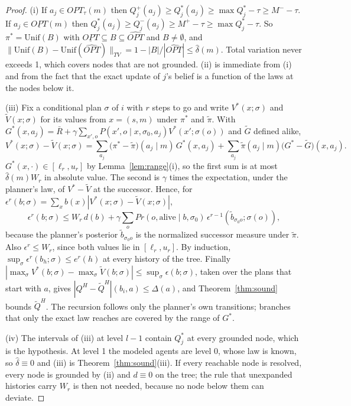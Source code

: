 \documentclass{article}
\newcommand{\OPT}{\mathit{OPT}}
\renewcommand{\Pr}{\mathit{Pr}}
\begin{document}
\begin{proof}
(i) If $a_j\in\OPT_\tau(m)$ then $Q_j^+(a_j)\ge Q_j^\ast(a_j)\ge\max Q_j^\ast-\tau\ge M^--\tau$. If
$a_j\in\underline{\OPT}(m)$ then $Q_j^\ast(a_j)\ge Q_j^-(a_j)\ge M^+-\tau\ge\max Q_j^\ast-\tau$. So
$\pi^\ast=\mathrm{Unif}(B)$ with $\underline{\OPT}\subseteq B\subseteq\widehat{\OPT}$ and $B\neq\emptyset$, and
$\|\mathrm{Unif}(B)-\mathrm{Unif}(\widehat{\OPT})\|_{TV}=1-|B|/|\widehat{\OPT}|\le\hat\delta(m)$. Total
variation never exceeds 1, which covers nodes that are not grounded. (ii) is immediate from (i) and from the
fact that the exact update of $j$'s belief is a function of the laws at the nodes below it.

(iii) Fix a conditional plan $\sigma$ of $i$ with $r$ steps to go and write $V^\ast(x;\sigma)$ and
$\tilde V(x;\sigma)$ for its values from $x=(s,m)$ under $\pi^\ast$ and $\tilde\pi$. With
$G^\ast(x,a_j)=\bar R+\gamma\sum_{x',o}P(x',o\mid x,\sigma_0,a_j)V^\ast(x';\sigma(o))$ and $\tilde G$ defined
alike,
\[
V^\ast(x;\sigma)-\tilde V(x;\sigma)=\sum_{a_j}\big(\pi^\ast-\tilde\pi\big)(a_j\mid m)\,G^\ast(x,a_j)
+\sum_{a_j}\tilde\pi(a_j\mid m)\big(G^\ast-\tilde G\big)(x,a_j).
\]
$G^\ast(x,\cdot)\in[\ell_r,u_r]$ by Lemma~\ref{lem:range}(i), so the first sum is at most
$\hat\delta(m)W_r$ in absolute value. The second is $\gamma$ times the expectation, under the planner's law, of
$V^\ast-\tilde V$ at the successor. Hence, for $\epsilon^r(b;\sigma)=\sum_xb(x)|V^\ast(x;\sigma)-\tilde
V(x;\sigma)|$,
\[
\epsilon^r(b;\sigma)\le W_r\,d(b)+\gamma\sum_o\Pr(o,\mathrm{alive}\mid b,\sigma_0)\,
\epsilon^{r-1}(\tilde b_{\sigma_0o};\sigma(o)),
\]
because the planner's posterior $\tilde b_{\sigma_0o}$ is the normalized successor measure under
$\tilde\pi$. Also $\epsilon^r\le W_r$, since both values lie in $[\ell_r,u_r]$. By induction,
$\sup_\sigma\epsilon^r(b_h;\sigma)\le e^r(h)$ at every history of the tree. Finally
$|\max_\sigma V^\ast(b;\sigma)-\max_\sigma\tilde V(b;\sigma)|\le\sup_\sigma\epsilon(b;\sigma)$, taken over the
plans that start with $a$, gives $|Q^H-\tilde Q^H|(b_i,a)\le\Delta(a)$, and Theorem~\ref{thm:sound} bounds
$\tilde Q^H$. The recursion follows only the planner's own transitions; branches that only the exact law
reaches are covered by the range of $G^\ast$.

(iv) The intervals of (iii) at level $l-1$ contain $Q_j^\ast$ at every grounded node, which is the hypothesis.
At level 1 the modeled agents are level 0, whose law is known, so $\hat\delta\equiv0$ and (iii) is
Theorem~\ref{thm:sound}(iii). If every reachable node is resolved, every node is grounded by (ii) and
$d\equiv0$ on the tree; the rule that unexpanded histories carry $W_r$ is then not needed, because no node
below them can deviate.
\end{proof}
\end{document}
